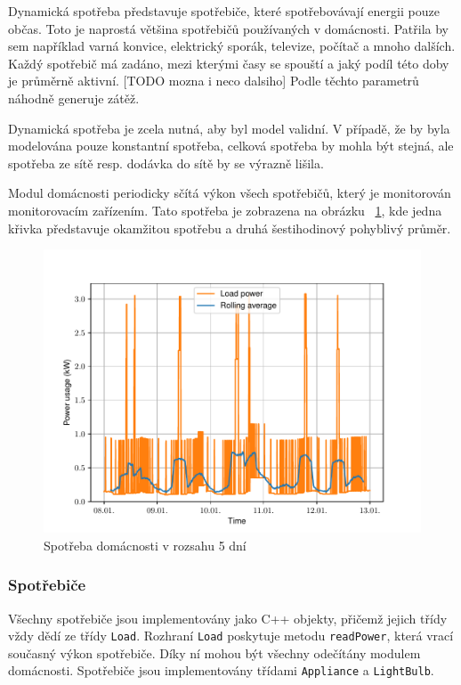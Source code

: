 \documentclass[12pt,a4paper]{Cotmas-2018}
\begin{document}
Dynamická spotřeba představuje spotřebiče, které spotřebovávají energii pouze občas.
Toto je naprostá většina spotřebičů používaných v domácnosti.
Patřila by sem například varná konvice, elektrický sporák, televize, počítač a mnoho dalších.
Každý spotřebič má zadáno, mezi kterými časy se spouští a jaký podíl této doby je průměrně aktivní. [TODO mozna i neco dalsiho]
Podle těchto parametrů náhodně generuje zátěž.

Dynamická spotřeba je zcela nutná, aby byl model validní.
V případě, že by byla modelována pouze konstantní spotřeba,
celková spotřeba by mohla být stejná, ale spotřeba ze sítě resp. dodávka do sítě by se výrazně lišila.

Modul domácnosti periodicky sčítá výkon všech spotřebičů, který je monitorován monitorovacím zařízením.
Tato spotřeba je zobrazena na obrázku ~\ref{fig:load_power},
kde jedna křivka představuje okamžitou spotřebu a druhá šestihodinový pohyblivý průměr.

\begin{figure}
\includegraphics[width=\linewidth]{img/load_power.pdf}
\caption{Spotřeba domácnosti v rozsahu 5 dní}
\label{fig:load_power}
\end{figure}

\subsubsection{Spotřebiče}
Všechny spotřebiče jsou implementovány jako C++ objekty, přičemž jejich třídy vždy dědí ze třídy \texttt{Load}.
Rozhraní \texttt{Load} poskytuje metodu \texttt{readPower}, která vrací současný výkon spotřebiče.
Díky ní mohou být všechny odečítány modulem domácnosti.
Spotřebiče jsou implementovány třídami \texttt{Appliance} a \texttt{LightBulb}.
\end{document}
